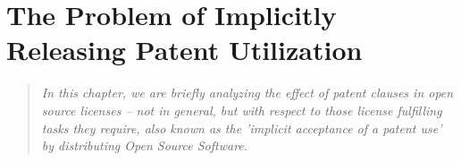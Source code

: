 %
%
%
%
%



\section{The Problem of Implicitly Releasing Patent Utilization}
\footnotesize \begin{quote}\itshape In this chapter, we are briefly analyzing
the effect of patent clauses in open source licenses -- not in general, but with
respect to those license fulfilling tasks they require, also known as the
'implicit acceptance of a patent use' by distributing Open Source Software.
\end{quote}
\normalsize

